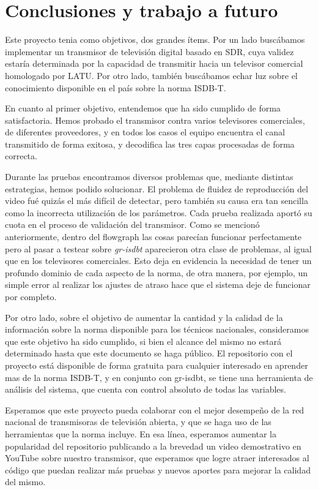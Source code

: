 \chapter{Conclusiones y trabajo a futuro}

Este proyecto tenia como objetivos, dos grandes ítems. Por un lado buscábamos implementar un transmisor de televisión digital basado en SDR, cuya validez estaría determinada por la capacidad de transmitir hacia un televisor comercial homologado por LATU. Por otro lado, también buscábamos echar luz sobre el conocimiento disponible en el país sobre la norma ISDB-T. 

En cuanto al primer objetivo, entendemos que ha sido cumplido de forma satisfactoria. Hemos probado el transmisor contra varios televisores comerciales, de diferentes proveedores, y en todos los casos el equipo encuentra el canal transmitido de forma exitosa, y decodifica las tres capas procesadas de forma correcta. 

Durante las pruebas encontramos diversos problemas que, mediante distintas estrategias, hemos podido solucionar. El problema de fluidez de reproducción del video fué quizás el más difícil de detectar, pero también su causa era tan sencilla como la incorrecta utilización de los parámetros. Cada prueba realizada aportó su cuota en el proceso de validación del transmisor. Como se mencionó anteriormente, dentro del flowgraph las cosas parecían funcionar perfectamente pero al pasar a testear sobre \textit{gr-isdbt} aparecieron otra clase de problemas, al igual que en los televisores comerciales. Esto deja en evidencia la necesidad de tener un profundo dominio de cada aspecto de la norma, de otra manera, por ejemplo, un simple error al realizar los ajustes de atraso hace que el sistema deje de funcionar por completo.

Por otro lado, sobre el objetivo de aumentar la cantidad y la calidad de la información sobre la norma disponible para los técnicos nacionales, consideramos que este objetivo ha sido cumplido, si bien el alcance del mismo no estará determinado hasta que este documento se haga público. El repositorio con el proyecto está disponible de forma gratuita para cualquier interesado en aprender mas de la norma ISDB-T, y en conjunto con gr-isdbt, se tiene una herramienta de análisis del sistema, que cuenta con control absoluto de todas las variables. 

Esperamos que este proyecto pueda colaborar con el mejor desempeño de la red nacional de transmisoras de televisión abierta, y que se haga uso de las herramientas que la norma incluye. En esa línea, esperamos aumentar la popularidad del repositorio publicando a la brevedad un video demostrativo en YouTube sobre nuestro transmisor, que esperamos que logre atraer interesados al código que puedan realizar más pruebas y nuevos aportes para mejorar la calidad del mismo.

